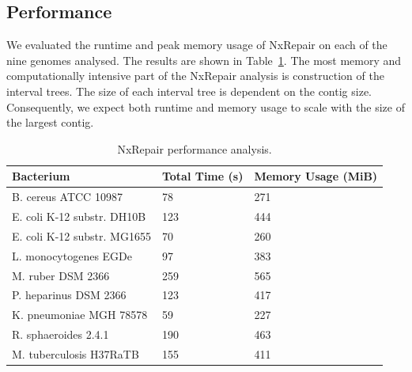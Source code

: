 \subsection*{Performance}
We evaluated the runtime and peak memory usage of NxRepair on each of the nine genomes analysed. The results are shown in Table~\ref{tab:performance}. The most memory and computationally intensive part of the NxRepair analysis is construction of the interval trees. The size of each interval tree is dependent on the contig size. Consequently, we expect both runtime and memory usage to scale with the size of the largest contig. 

\begin{table}
\begin{center}
\begin{tabular}{lll}
    \hline
    Bacterium & Total Time (s) & Memory Usage (MiB) \\ \hline
    B. cereus ATCC 10987 & 78 & 271 \\
    E. coli K-12 substr. DH10B & 123 & 444 \\
    E. coli K-12 substr. MG1655 & 70 & 260 \\
    L. monocytogenes EGDe & 97 & 383 \\
    M. ruber DSM 2366 & 259 & 565 \\
    P. heparinus DSM 2366 & 123 & 417 \\
    K. pneumoniae MGH 78578 & 59 & 227 \\
    R. sphaeroides 2.4.1 & 190 & 463 \\
    M. tuberculosis H37RaTB & 155 & 411 \\ 
    \hline
\end{tabular}
\end{center}
\caption{NxRepair performance analysis. \label{tab:performance}}
\end{table}

